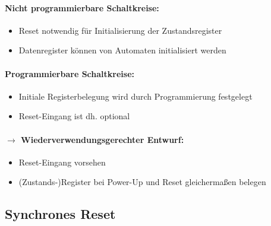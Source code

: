 	\paragraph{Nicht programmierbare Schaltkreise:}
	\begin{itemize}
		\item Reset notwendig für Initialisierung der Zustandsregister
		\item Datenregister können von Automaten initialisiert werden
	\end{itemize}
	
	\paragraph{Programmierbare Schaltkreise:}
	\begin{itemize}
		\item Initiale Registerbelegung wird durch Programmierung festgelegt
		\item Reset-Eingang ist dh. optional
	\end{itemize}
	
	\paragraph{$\rightarrow$ Wiederverwendungsgerechter Entwurf:}
	\begin{itemize}
		\item Reset-Eingang vorsehen
		\item (Zustands-)Register bei Power-Up und Reset gleichermaßen belegen
	\end{itemize}
	
\subsection{Synchrones Reset}
